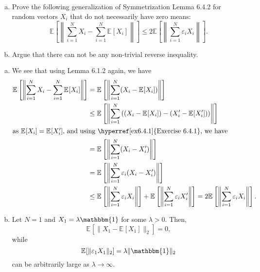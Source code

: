 \begin{problem*}[Exercise 6.4.4]\label{ex6.4.4}
	\begin{enumerate}[(a)]
		\item\label{ex6.4.4:a} Prove the following generalization of Symmetrization Lemma 6.4.2 for random vectors \(X_i\) that do not necessarily have zero means:
		      \[
			      \mathbb{E}_{}\left[\left\lVert \sum_{i=1}^{N} X_i - \sum_{i=1}^{N} \mathbb{E}_{}[X_i] \right\rVert \right]
			      \leq 2 \mathbb{E}_{}\left[\left\lVert \sum_{i=1}^{N} \varepsilon _i X_i \right\rVert \right] .
		      \]
		\item\label{ex6.4.4:b} Argue that there can not be any non-trivial reverse inequality.
	\end{enumerate}
\end{problem*}
\begin{answer}
	\begin{enumerate}[(a)]
		\item We see that using Lemma 6.1.2 again, we have
		      \begin{align*}
			      \mathbb{E}_{}\left[\left\lVert \sum_{i=1}^{N} X_i - \sum_{i=1}^{N} \mathbb{E}_{}[X_i] \right\rVert \right]
			       & = \mathbb{E}_{}\left[\left\lVert \sum_{i=1}^{N} (X_i - \mathbb{E}_{}[X_i] ) \right\rVert \right]                                                                                            \\
			       & \leq \mathbb{E}_{}\left[\left\lVert \sum_{i=1}^{N} \left( (X_i - \mathbb{E}_{}[X_i] ) - (X_i^{\prime} - \mathbb{E}_{}[X_i^{\prime} ] ) \right) \right\rVert \right]                         \\
			      \shortintertext{as \(\mathbb{E}_{}[X_i] = \mathbb{E}_{}[X_i^{\prime} ] \), and using \hyperref[ex6.4.1]{Exercise 6.4.1}, we have}
			       & = \mathbb{E}_{}\left[\left\lVert \sum_{i=1}^{N} (X_i - X_i^{\prime} ) \right\rVert \right]                                                                                                  \\
			       & = \mathbb{E}_{}\left[\left\lVert \sum_{i=1}^{N} \varepsilon _i (X_i - X_i^{\prime} ) \right\rVert \right]                                                                                   \\
			       & \leq \mathbb{E}_{}\left[\left\lVert \sum_{i=1}^{N} \varepsilon _i X_i \right\rVert \right] + \mathbb{E}_{}\left[\left\lVert \sum_{i=1}^{N} \varepsilon _i X_i^{\prime} \right\rVert \right]
			      = 2 \mathbb{E}_{}\left[\left\lVert \sum_{i=1}^{N} \varepsilon _i X_i \right\rVert \right] .
		      \end{align*}
		\item Let \(N = 1\) and \(X_1 = \lambda \mathbbm{1} \) for some \(\lambda > 0\). Then,
		      \[
			      \mathbb{E}_{}[\lVert X_1 - \mathbb{E}_{}[X_1] \rVert _2] = 0,
		      \]
		      while
		      \[
			      \mathbb{E}_{}[\lVert \varepsilon _1 X_1 \rVert _2] = \lambda \lVert \mathbbm{1} \rVert _2
		      \]
		      can be arbitrarily large as \(\lambda \to \infty \).
	\end{enumerate}
\end{answer}

